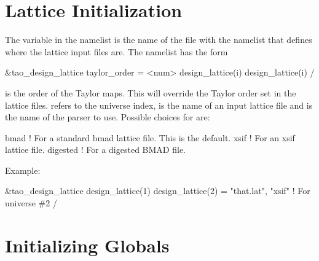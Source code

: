\section{Lattice Initialization}
\label{s:init_lat} 

The  variable in the  namelist is the
name of the file with the  namelist that
defines where the lattice input files are. The 
namelist has the form
\begin{example}
  &tao_design_lattice
    taylor_order = <num>
    design_lattice(i)%
    design_lattice(i)%
  /
\end{example}
 is the order of the Taylor maps. This will override
the Taylor order set in the lattice files.  refers to the
universe index,  is the name of an input lattice
file and  is the name of the parser to use. Possible
choices for  are:
\begin{example}
  bmad      ! For a standard bmad lattice file. This is the default.
  xsif      ! For an xsif lattice file.
  digested  ! For a digested BMAD file.
\end{example}

Example:
\begin{example}
  &tao_design_lattice
    design_lattice(1)%
    design_lattice(2)      = "that.lat", "xsif"  ! For universe \#2
  /
\end{example}

\section{Initializing Globals}
\label{s:globals} 


